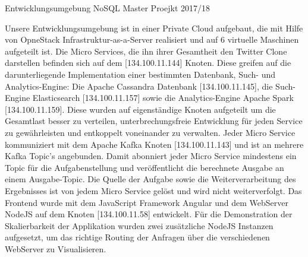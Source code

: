 Entwicklungsumgebung NoSQL Master Proejkt 2017/18

Unsere Entwicklungsumgebung ist in einer Private Cloud aufgebaut, die mit Hilfe von OpneStack Infrastruktur-as-a-Server realisiert und auf 6 virtuelle Maschinen aufgeteilt ist. 
Die Micro Services, die ihn ihrer Gesamtheit den Twitter Clone darstellen befinden sich auf dem [134.100.11.144] Knoten. Diese greifen auf die darunterliegende Implementation einer bestimmten Datenbank, Such- und Analytics-Engine: Die Apache Cassandra Datenbank [134.100.11.145], die Such-Engine Elasticsearch [134.100.11.157] sowie die Analytics-Engine Apache Spark [134.100.11.159]. Diese wurden auf eigenständige Knoten aufgeteilt um die Gesamtlast besser zu verteilen, unterbrechungsfreie Entwicklung für jeden Service zu gewährleisten und entkoppelt voneinander zu verwalten.
Jeder Micro Service kommuniziert mit dem Apache Kafka Knoten [134.100.11.143] und ist an mehrere Kafka Topic's angebunden. Damit abonniert jeder Micro Service mindestens ein Topic für die Aufgabenstellung und veröffentlicht die berechnete Ausgabe an einem Ausgabe-Topic.
Die Quelle der Aufgabe sowie die Weiterverarbeitung des Ergebnisses ist von jedem Micro Service gelöst und wird nicht weiterverfolgt. 
Das Frontend wurde mit dem JavaScript Framework Angular und dem WebServer NodeJS auf dem Knoten [134.100.11.58] entwickelt. Für die Demonstration der Skalierbarkeit der Applikation wurden zwei zusätzliche NodeJS Instanzen aufgesetzt, um das richtige Routing der Anfragen über die verschiedenen WebServer zu Visualisieren. 

